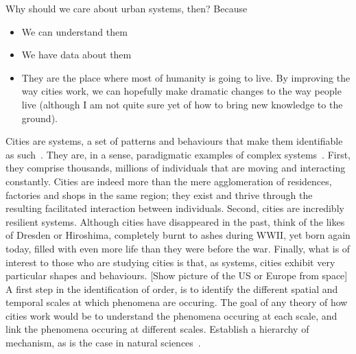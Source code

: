 Why should we care about urban systems, then? Because
\begin{itemize}
    \item We can understand them
    \item We have data about them
    \item They are the place where most of humanity is going to live. By
        improving the way cities work, we can hopefully make dramatic changes to
        the way people live (although I am not quite sure yet of how to bring
        new knowledge to the ground).
\end{itemize}

Cities are systems, a set of patterns and behaviours that make them identifiable
as such~\cite{Dennett:1991}. They are, in a sense, paradigmatic examples of
complex systems~\cite{Ladyman:2013}. First, they comprise thousands, millions
of individuals that are moving and interacting constantly. Cities are indeed
more than the mere agglomeration of residences, factories and shops in the same
region; they exist and thrive through the resulting facilitated interaction
between individuals. Second, cities are incredibly resilient systems. Although
cities have disappeared in the past, think of the likes of Dresden or Hiroshima,
completely burnt to ashes during WWII, yet born again today, filled with even
more life than they were before the war. Finally, what is of interest to those
who are studying cities is that, as systems, cities exhibit very particular
shapes and behaviours. [Show picture of the US or Europe from space]\\

A first step in the identification of order, is to identify the different
spatial and temporal scales at which phenomena are occuring. The goal of any
theory of how cities work would be to understand the phenomena occuring at each
scale, and link the phenomena occuring at different scales. Establish a
hierarchy of mechanism, as is the case in natural sciences~\cite{Simon:1962}.

